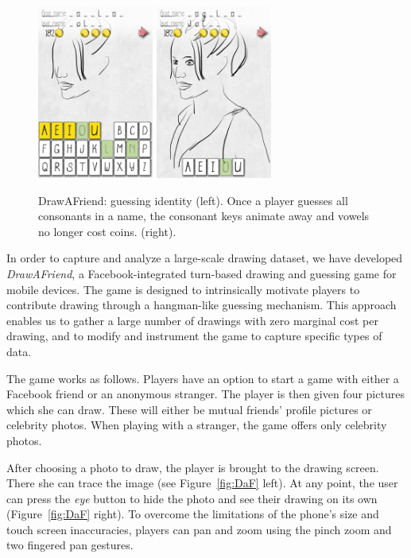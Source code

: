 \begin{figure}
  \centering%
\includegraphics[width=1.5in]{DaF/angelina_guess1.png}
\hspace{0.1in}
\includegraphics[width=1.5in]{DaF/angelina_guess2.png}
  \caption{DrawAFriend: guessing identity (left). Once a player guesses all consonants in a name, the consonant keys animate away and vowels no longer cost coins. (right).}
  \label{fig:DaF2}
\end{figure}

In order to capture and analyze a large-scale drawing dataset, we have developed \emph{DrawAFriend}, a Facebook-integrated turn-based drawing and guessing game for mobile devices. The game is designed to intrinsically motivate players to contribute drawing through a hangman-like guessing mechanism. This approach enables us to gather a large number of drawings with zero marginal cost per drawing, and to modify and instrument the game to capture specific types of data.

The game works as follows. Players have an option to start a game with either a Facebook friend or an anonymous stranger.  The player is then given four pictures which she can draw. These will either be mutual friends' profile pictures or  celebrity photos. When playing with a stranger, the game offers only celebrity photos.

After choosing a photo to draw, the player is brought to the drawing screen. There she can trace the image (see Figure~\ref{fig:DaF} left). At any point, the user can press the {\em eye} button to hide the photo and see their drawing on its own (Figure~\ref{fig:DaF} right). To overcome the limitations of the phone's size and touch screen inaccuracies, players can pan and zoom using the pinch zoom and two fingered pan gestures.

